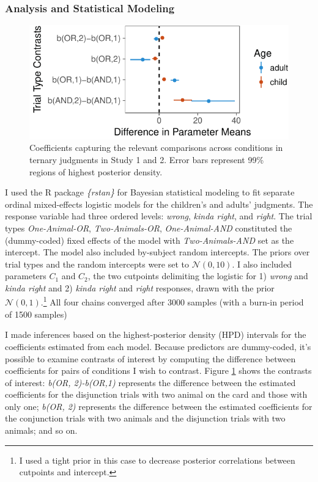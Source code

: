 \documentclass[oneside]{report}
\theoremstyle{definition}
\theoremstyle{definition}
\theoremstyle{definition}
\theoremstyle{remark}
\begin{document}
\subsubsection{Analysis and Statistical
Modeling}\label{analysis-and-statistical-modeling}
\begin{figure}[t]

{\centering \includegraphics{figs/stanModelPlot-1} 

}

\caption{Coefficients capturing the relevant comparisons across conditions in ternary judgments in Study 1 and 2. Error bars represent 99\% regions of highest posterior density.}\label{fig:stanModelPlot}
\end{figure}
I used the R package \emph{\{rstan\}} for Bayesian statistical modeling
to fit separate ordinal mixed-effects logistic models for the children's
and adults' judgments. The response variable had three ordered levels:
\emph{wrong}, \emph{kinda right}, and \emph{right}. The trial types
\emph{One-Animal-OR}, \emph{Two-Animals-OR}, \emph{One-Animal-AND}
constituted the (dummy-coded) fixed effects of the model with
\emph{Two-Animals-AND} set as the intercept. The model also included
by-subject random intercepts. The priors over trial types and the random
intercepts were set to \(\mathcal{N}(0,10)\). I also included parameters
\(C_1\) and \(C_2\), the two cutpoints delimiting the logistic for 1)
\emph{wrong} and \emph{kinda right} and 2) \emph{kinda right} and
\emph{right} responses, drawn with the prior
\(\mathcal{N}(0,1)\).\footnote{I used a tight prior in this case to
  decrease posterior correlations between cutpoints and intercept.} All
four chains converged after 3000 samples (with a burn-in period of 1500
samples)

I made inferences based on the highest-posterior density (HPD) intervals
for the coefficients estimated from each model. Because predictors are
dummy-coded, it's possible to examine contrasts of interest by computing
the difference between coefficients for pairs of conditions I wish to
contrast. Figure \ref{fig:stanModelPlot} shows the contrasts of
interest: \emph{b(OR, 2)-b(OR,1)} represents the difference between the
estimated coefficients for the disjunction trials with two animal on the
card and those with only one; \emph{b(OR, 2)} represents the difference
between the estimated coefficients for the conjunction trials with two
animals and the disjunction trials with two animals; and so on.
\end{document}
